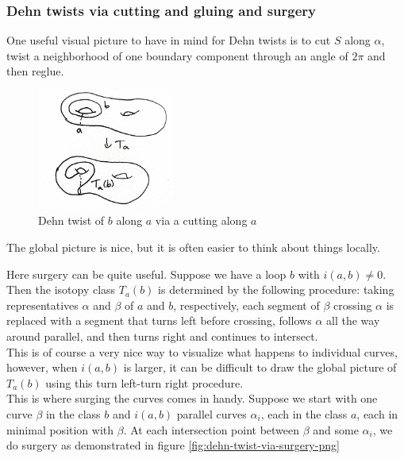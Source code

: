 \documentclass[reqno]{amsart}
\theoremstyle{definition}
\theoremstyle{remark}
\begin{document}
\subsubsection{Dehn twists via cutting and gluing and surgery}
\label{dehn-twist-cut-glue-surgery}

One useful visual picture to have in mind for Dehn twists
is to cut $S$ along $\alpha$, twist a neighborhood of
one boundary component through an angle of $2\pi$ and then
reglue.

\begin{figure}[H]
    \centering
    \includegraphics[width=0.4\textwidth]{dehn-twist-cutting-and-gluing.jpg}
    \caption{Dehn twist of $b$ along $a$ via a
    cutting along $a$}
    \label{fig:dehn-twist-cutting-and-gluing-png}
\end{figure}

The global picture is nice, but it is often easier to think 
about things locally.

Here surgery can be quite useful. Suppose we have
a loop $b$ with $i \left( a,b \right) \neq 0$. Then
the isotopy class $T_a (b)$ is determined by the following
procedure: taking representatives $\alpha$ and $\beta$ of
$a$ and $b$, respectively, each segment of $\beta$ crossing
$\alpha$ is replaced with a segment that turns left before crossing,
follows $\alpha$ all the way around parallel, and then
turns right and continues to intersect. \\

This is of course a very nice way to visualize what happens to
individual curves, however, when $i \left( a,b \right) $ is
larger, it can be difficult to draw the global picture
of $T_a (b)$ using this turn left-turn right procedure.\\

This is where surging the curves comes in handy. Suppose
we start with one curve $\beta$ in the class $b$ and
$i \left( a,b \right) $ parallel curves $\alpha_i$, each in
the class $a$, each in minimal position with
$\beta$. At each intersection point between $\beta$ and
some $\alpha_i$, we do surgery as demonstrated in figure
\ref{fig:dehn-twist-via-surgery-png}
\end{document}

